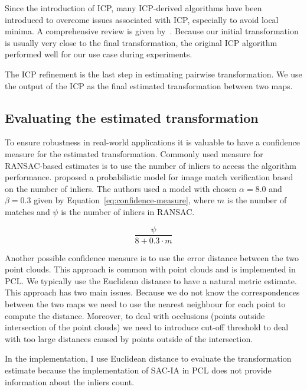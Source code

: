 Since the introduction of \gls{ICP}, many \gls{ICP}-derived algorithms have been introduced to overcome issues associated with \gls{ICP}, especially to avoid local minima. A comprehensive review is given by~\citet{pomerleau2015reviewregistration}. Because our initial transformation is usually very close to the final transformation, the original \gls{ICP} algorithm performed well for our use case during experiments.

The \gls{ICP} refinement is the last step in estimating pairwise transformation. We use the output of the \gls{ICP} as the final estimated transformation between two maps.

\subsection{Evaluating the estimated transformation}
\label{sec:transform-evaluation}

To ensure robustness in real-world applications it is valuable to have a confidence measure for the estimated transformation. Commonly used measure for \gls{RANSAC}-based estimates is to use the number of inliers to access the algorithm performance. \citet{brown2007automatic} proposed a probabilistic model for image match verification based on the number of inliers. The authors used a model with chosen $\alpha = 8.0$ and $\beta = 0.3$ given by Equation~\eqref{eq:confidence-measure}, where $m$ is the number of matches and $\psi$ is the number of inliers in \gls{RANSAC}.

\begin{equation}
\label{eq:confidence-measure}
\frac{\psi}{8 + 0.3 \cdot m}
\end{equation}

Another possible confidence measure is to use the error distance between the two point clouds. This approach is common with point clouds and is implemented in \gls{PCL}. We typically use the Euclidean distance to have a natural metric estimate. This approach has two main issues. Because we do not know the correspondences between the two maps we need to use the nearest neighbour for each point to compute the distance. Moreover, to deal with occlusions (points outside intersection of the point clouds) we need to introduce cut-off threshold to deal with too large distances caused by points outside of the intersection.

In the implementation, I use Euclidean distance to evaluate the transformation estimate because the implementation of \gls{SAC-IA} in \gls{PCL} does not provide information about the inliers count.

